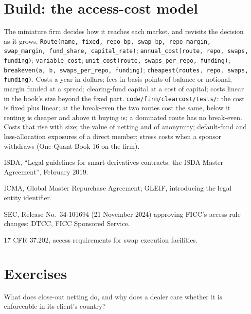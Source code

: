 \section{Build: the access-cost model}\label{bld:m2:getting-access-rates-credit:clearcost}

\begin{build}
 The miniature firm decides how it reaches each market, and revisits
the decision as it grows.
 \texttt{Route(name, fixed, repo\_bp, swap\_bp, repo\_margin,
swap\_margin, fund\_share, capital\_rate)}; \texttt{annual\_cost(route, repo, swaps,
funding)}; \texttt{variable\_cost}; \texttt{unit\_cost(route, swaps\_per\_repo,
funding)}; \texttt{breakeven(a, b, swaps\_per\_repo, funding)}; \texttt{cheapest(routes,
repo, swaps, funding)}.
 Costs a year in dollars; fees in basis points of balance or notional;
margin funded at a spread; clearing-fund capital at a cost of capital; costs linear in
the book's size beyond the fixed part.
 \texttt{code/firm/clearcost/tests/}: the cost is fixed plus
linear; at the break-even the two routes cost the same, below it renting is cheaper and
above it buying is; a dominated route has no break-even.
 Costs that rise with size; the value of netting and of anonymity;
default-fund and loss-allocation exposures of a direct member; stress costs when a
sponsor withdraws (One Quant Book 16 on the firm).
\end{build}

\begin{omsources}
\item ISDA, ``Legal guidelines for smart derivatives contracts: the ISDA Master
Agreement'', February 2019.
\item ICMA, Global Master Repurchase Agreement; GLEIF, introducing the legal entity
identifier.
\item SEC, Release No.~34-101694 (21 November 2024) approving FICC's access rule changes;
DTCC, FICC Sponsored Service.
\item 17 CFR 37.202, access requirements for swap execution facilities.
\end{omsources}

\section{Exercises}

\begin{exercise}[$\star$]\label{exo:m2:getting-access-rates-credit:1}
What does close-out netting do, and why does a dealer care whether it is enforceable in
its client's country?
\end{exercise}

